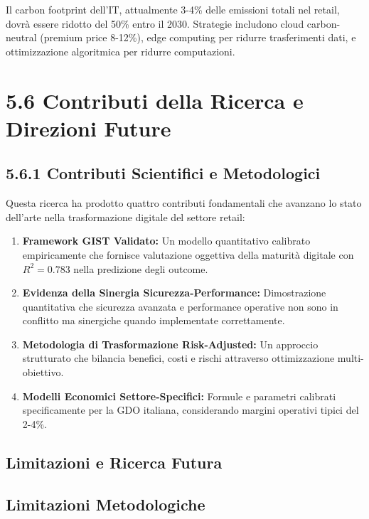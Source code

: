 Il carbon footprint dell'IT, attualmente 3-4\% delle emissioni totali nel retail, dovrà essere ridotto del 50\% entro il 2030. Strategie includono cloud carbon-neutral (premium price 8-12\%), edge computing per ridurre trasferimenti dati, e ottimizzazione algoritmica per ridurre computazioni.

\section{5.6 Contributi della Ricerca e Direzioni Future}

\subsection{5.6.1 Contributi Scientifici e Metodologici}

Questa ricerca ha prodotto quattro contributi fondamentali che avanzano lo stato dell'arte nella trasformazione digitale del settore retail:
\begin{enumerate}
    \item \textbf{Framework GIST Validato:} Un modello quantitativo calibrato empiricamente che fornisce valutazione oggettiva della maturità digitale con $R^2 = 0.783$ nella predizione degli outcome.

    \item \textbf{Evidenza della Sinergia Sicurezza-Performance:} Dimostrazione quantitativa che sicurezza avanzata e performance operative non sono in conflitto ma sinergiche quando implementate correttamente.

\item \textbf{Metodologia di Trasformazione Risk-Adjusted:} Un approccio strutturato che bilancia benefici, costi e rischi attraverso ottimizzazione multi-obiettivo.

\item \textbf{Modelli Economici Settore-Specifici:} Formule e parametri calibrati specificamente per la GDO italiana, considerando margini operativi tipici del 2-4\%.
\end{enumerate}
\subsection{Limitazioni e Ricerca Futura}

\subsection{Limitazioni Metodologiche}

